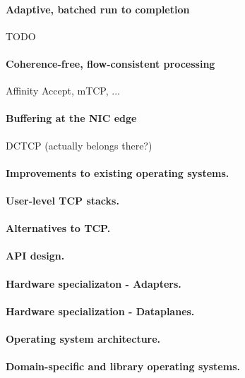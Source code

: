\paragraph{Adaptive, batched run to completion}

\todo TODO

\paragraph{Coherence-free, flow-consistent processing}

\todo Affinity Accept, mTCP, ...

\paragraph{Buffering at the NIC edge}

\todo DCTCP (actually belongs there?)


\paragraph{Improvements to existing operating systems.}

\paragraph{User-level TCP stacks.}

\paragraph{Alternatives to TCP.}

\paragraph{API design.}

\paragraph{Hardware specializaton - Adapters.}

\paragraph{Hardware specialization - Dataplanes.}

\paragraph{Operating system architecture.}

\paragraph{Domain-specific and library operating systems.}
